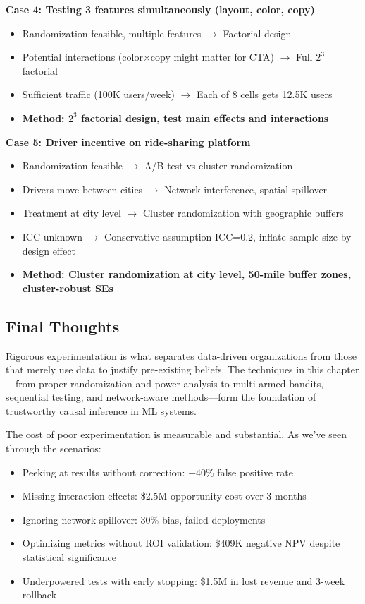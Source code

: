 \textbf{Case 4: Testing 3 features simultaneously (layout, color, copy)}
\begin{itemize}
    \item Randomization feasible, multiple features $\rightarrow$ Factorial design
    \item Potential interactions (color$\times$copy might matter for CTA) $\rightarrow$ Full $2^3$ factorial
    \item Sufficient traffic (100K users/week) $\rightarrow$ Each of 8 cells gets 12.5K users
    \item \textbf{Method: $2^3$ factorial design, test main effects and interactions}
\end{itemize}

\textbf{Case 5: Driver incentive on ride-sharing platform}
\begin{itemize}
    \item Randomization feasible $\rightarrow$ A/B test vs cluster randomization
    \item Drivers move between cities $\rightarrow$ Network interference, spatial spillover
    \item Treatment at city level $\rightarrow$ Cluster randomization with geographic buffers
    \item ICC unknown $\rightarrow$ Conservative assumption ICC=0.2, inflate sample size by design effect
    \item \textbf{Method: Cluster randomization at city level, 50-mile buffer zones, cluster-robust SEs}
\end{itemize}

\subsection{Final Thoughts}

Rigorous experimentation is what separates data-driven organizations from those that merely use data to justify pre-existing beliefs. The techniques in this chapter---from proper randomization and power analysis to multi-armed bandits, sequential testing, and network-aware methods---form the foundation of trustworthy causal inference in ML systems.

The cost of poor experimentation is measurable and substantial. As we've seen through the scenarios:
\begin{itemize}
    \item Peeking at results without correction: +40\% false positive rate
    \item Missing interaction effects: \$2.5M opportunity cost over 3 months
    \item Ignoring network spillover: 30\% bias, failed deployments
    \item Optimizing metrics without ROI validation: \$409K negative NPV despite statistical significance
    \item Underpowered tests with early stopping: \$1.5M in lost revenue and 3-week rollback
\end{itemize}

